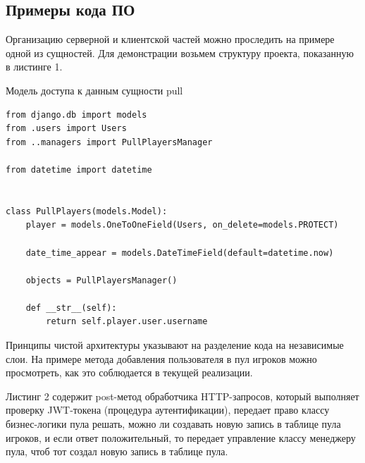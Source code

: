 \documentclass[a4paper,14pt]{extarticle}
\begin{document}
 	\newpage
 	
 	\subsection{Примеры кода ПО}
 	
 	Организацию серверной и клиентской частей можно проследить на примере одной из сущностей. Для демонстрации возьмем структуру проекта, показанную в листинге 1.
 	
 	\begin{listing}
 		\caption{Модель доступа к данным сущности pull}
 		\label{code:pull_model}
 		\begin{verbatim}
from django.db import models
from .users import Users
from ..managers import PullPlayersManager

from datetime import datetime


class PullPlayers(models.Model):
	player = models.OneToOneField(Users, on_delete=models.PROTECT)
	
	date_time_appear = models.DateTimeField(default=datetime.now)
	
	objects = PullPlayersManager()
	
	def __str__(self):
		return self.player.user.username
 		\end{verbatim}
 	\end{listing}
 
 
 	Принципы чистой архитектуры указывают на разделение кода на независимые слои. На примере метода добавления пользователя в пул игроков можно просмотреть, как это соблюдается в текущей реализации. 
 	
 	\newpage
 	
 	Листинг 2 содержит post-метод обработчика HTTP-запросов, который выполняет проверку JWT-токена (процедура аутентификации), передает право классу бизнес-логики пула решать, можно ли создавать новую запись в таблице пула игроков, и если ответ положительный, то передает управление классу менеджеру пула, чтоб тот создал новую запись в таблице пула.
 	
\end{document}
